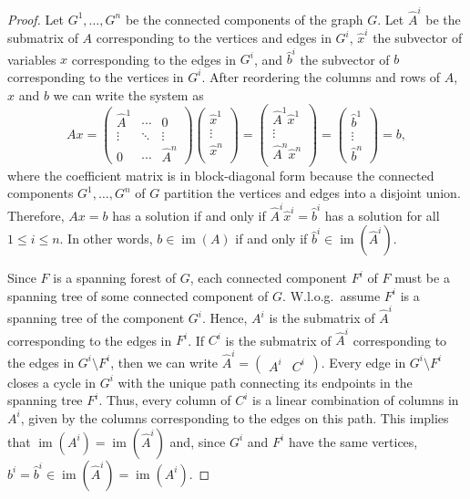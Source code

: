 \documentclass[10pt,a4paper]{amsart}
\DeclareMathOperator{\im}{im}
\begin{document}
\begin{proof}
Let $G^1,\ldots,G^n$ be the connected components of the graph $G$. Let $\hat{A}^i$ be the submatrix of $A$ corresponding to the vertices and edges in $G^i$, $\hat{x}^i$ the subvector of variables $x$ corresponding to the edges in $G^i$, and $\hat{b}^i$ the subvector of $b$ corresponding to the vertices in $G^i$. After reordering the columns and rows of $A$, $x$ and $b$ we can write the system as
\begin{equation*}
Ax=
\begin{pmatrix}
\hat{A}^1 & \cdots & 0 \\
\vdots & \ddots & \vdots \\
0 & \cdots & \hat{A}^n
\end{pmatrix}
\begin{pmatrix}
\hat{x}^1 \\
\vdots \\
\hat{x}^n \\
\end{pmatrix}=
\begin{pmatrix}
\hat{A}^1\hat{x}^1 \\
\vdots \\
\hat{A}^n\hat{x}^n \\
\end{pmatrix}=
\begin{pmatrix}
\hat{b}^1 \\
\vdots \\
\hat{b}^n 
\end{pmatrix}=b ,
\end{equation*}
where the coefficient matrix is in block-diagonal form because the connected components $G^1,\ldots,G^n$ of $G$ partition the vertices and edges into a disjoint union. Therefore, $Ax=b$ has a solution if and only if $\hat{A}^i\hat{x}^i=\hat{b}^i$ has a solution for all $1\leq i\leq n$. In other words, $b\in\im(A)$ if and only if $\hat{b}^i\in\im(\hat{A}^i)$. 

Since $F$ is a spanning forest of $G$, each connected component $F^i$ of $F$ must be a spanning tree of some connected component of $G$. W.l.o.g.\ assume $F^i$ is a spanning tree of the component $G^i$. Hence, $A^i$ is the submatrix of $\hat{A}^i$ corresponding to the edges in $F^i$. If $C^i$ is the submatrix of $\hat{A}^i$ corresponding to the edges in $G^i\setminus F^i$, then we can write $\hat{A}^i=\begin{pmatrix}A^i & C^i \end{pmatrix}$. Every edge in $G^i\setminus F^i$ closes a cycle in $G^i$ with the unique path connecting its endpoints in the spanning tree $F^i$. Thus, every column of $C^i$ is a linear combination of columns in $A^i$, given by the columns corresponding to the edges on this path. This implies that $\im(A^i)=\im(\hat{A}^i)$ and, since $G^i$ and $F^i$ have the same vertices, $b^i=\hat{b}^i\in \im(\hat{A}^i)=\im(A^i)$.  


\end{proof}
\end{document}
